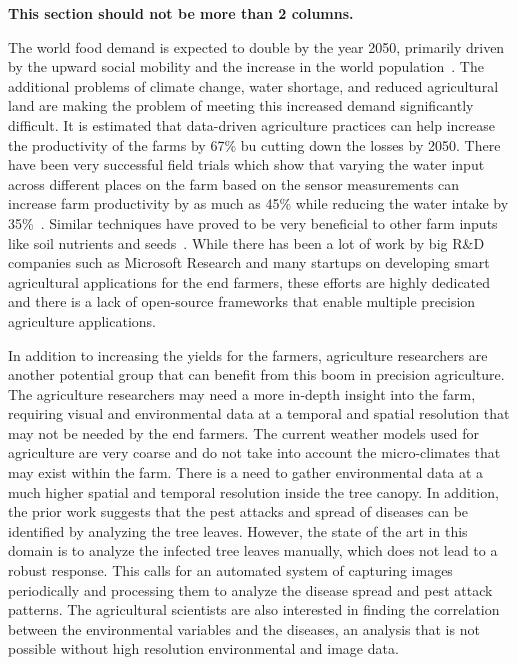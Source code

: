 \textbf{This section should not be more than 2 columns.}

The world food demand is expected to double by the year 2050, primarily driven by the upward social mobility and the increase in the world population~\cite{godfray2010food}. 
The additional problems of climate change, water shortage, and reduced agricultural land are making the problem of meeting this increased demand significantly difficult. 
It is estimated that data-driven agriculture practices can help increase the productivity of the farms by 67\% bu cutting down the losses by 2050. 
There have been very successful field trials which show that varying the water input across different places on the farm based on the sensor measurements can increase farm productivity by as much as 45\% while reducing the water intake by 35\%~\cite{almarshadi2011effects}.  Similar techniques have proved to be very beneficial to other farm inputs like soil nutrients and seeds~\cite{kim2009soil}. While there has been a lot of work by big R\&D companies such as Microsoft Research and many startups on developing smart agricultural applications for the end farmers, these efforts are highly dedicated and there is a lack of open-source frameworks that enable multiple precision agriculture applications.

In addition to increasing the yields for the farmers, agriculture researchers are another potential group that can benefit from this boom in precision agriculture. The agriculture researchers may need a more in-depth insight into the farm, requiring visual and environmental data at a temporal and spatial resolution that may not be needed by the end farmers. 
The current weather models used for agriculture are very coarse and do not take into account the micro-climates that may exist within the farm.  There is a need to gather environmental data at a much higher spatial and temporal resolution inside the tree canopy. In addition, the prior work suggests that the pest attacks and spread of diseases can be identified by analyzing the tree leaves. However, the state of the art in this domain is to analyze the infected tree leaves manually, which does not lead to a robust response. This calls for an automated system of capturing images periodically and processing them to analyze the disease spread and pest attack patterns. The agricultural scientists are also interested in finding the correlation between the environmental variables and the diseases, an analysis that is not possible without high resolution environmental and image data.

